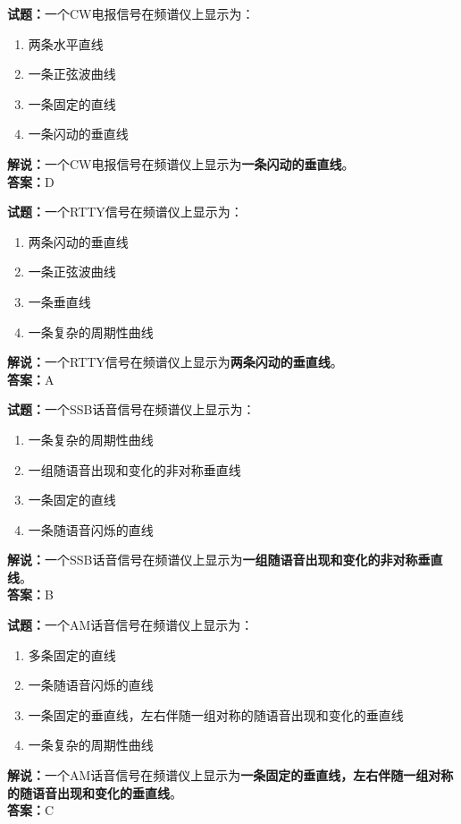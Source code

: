 \documentclass{ctexbook}
\begin{document}
\bigskip


\noindent\textbf{试题：}一个CW电报信号在频谱仪上显示为：
\begin{enumerate}[leftmargin=3em]
\item 两条水平直线
\item 一条正弦波曲线
\item 一条固定的直线
\item 一条闪动的垂直线
\end{enumerate}
\noindent\textbf{解说：}一个CW电报信号在频谱仪上显示为\textbf{一条闪动的垂直线}。\\\noindent\textbf{答案：}D




\bigskip


\noindent\textbf{试题：}一个RTTY信号在频谱仪上显示为：
\begin{enumerate}[leftmargin=3em]
\item 两条闪动的垂直线
\item 一条正弦波曲线
\item 一条垂直线
\item 一条复杂的周期性曲线
\end{enumerate}
\noindent\textbf{解说：}一个RTTY信号在频谱仪上显示为\textbf{两条闪动的垂直线}。\\\noindent\textbf{答案：}A



\bigskip


\noindent\textbf{试题：}一个SSB话音信号在频谱仪上显示为：
\begin{enumerate}[leftmargin=3em]
\item 一条复杂的周期性曲线
\item 一组随语音出现和变化的非对称垂直线
\item 一条固定的直线
\item 一条随语音闪烁的直线
\end{enumerate}
\noindent\textbf{解说：}一个SSB话音信号在频谱仪上显示为\textbf{一组随语音出现和变化的非对称垂直线}。\\\noindent\textbf{答案：}B




\bigskip


\noindent\textbf{试题：}一个AM话音信号在频谱仪上显示为：
\begin{enumerate}[leftmargin=3em]
\item 多条固定的直线
\item 一条随语音闪烁的直线
\item 一条固定的垂直线，左右伴随一组对称的随语音出现和变化的垂直线
\item 一条复杂的周期性曲线
\end{enumerate}
\noindent\textbf{解说：}一个AM话音信号在频谱仪上显示为\textbf{一条固定的垂直线，左右伴随一组对称的随语音出现和变化的垂直线}。\\\noindent\textbf{答案：}C
\end{document}
